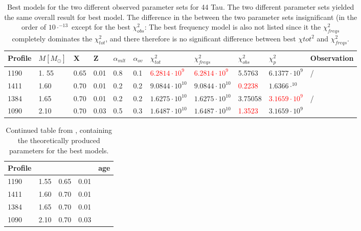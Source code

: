 \begin{table}
	\caption{Best models for the two different observed parameter sets for 44 Tau. The two different parameter sets yielded the same overall result for best model. The difference in the \chis between the two parameter sets insignificant (in the order of $10\cdot^{-13}$ except for the best $\chi_{obs}^2$: The best frequency model is also not listed since it the $\chi_{freqs}^2$ completely dominates the $\chi_{tot}^2$, and there therefore is no significant difference between best $\chi{tot}^2$ and $\chi_{freqs}^2$. }
	\label{bestmodels}
	
	\begin{tabular}{lllllllllll}
		\toprule
		Profile & $M[M_\odot]$  & X & Z & $\alpha_{mlt}$ & $\alpha_{ov}$ & $\chi_{tot}^2$ &$\chi_{freqs}^2$ & $\chi_{obs}^2$ & $\chi_{p}^2$ & Observation\\
		\midrule
		1190 &1. 55 & 0.65  & 0.01  & 0.8  & 0.1  & \textcolor{red}{$6.2814 \cdot 10^{9}$} &  \textcolor{red}{$6.2814 \cdot 10^{9}$} & 5.5763 & $6.1377 \cdot 10^{9}$ &  \citet{lenz2010delta}/\citet{brown2018gaia}\\
		1411 & 1.60 & 0.70  & 0.01  & 0.2  & 0.2 &  $9.0844\cdot 10^{10}$ & $9.0844\cdot 10^{10}$ & \textcolor{red}{0.2238} & $1.6366 \cdot^{10}$ &  \citet{lenz2010delta}  \\
		1384 & 1.65 & 0.70 & 0.01 & 0.2  & 0.2  & $1.6275\cdot10^{10}$    & $1.6275 \cdot 10^{10} $ & 3.75058  & \textcolor{red}{$3.1659 \cdot 10^{9} $} & \citet{lenz2010delta}/\citet{brown2018gaia}\\
		1090 & 2.10 & 0.70 & 0.03 & 0.5  & 0.3  &  $1.6487\cdot10^{10}$    & $1.6487 \cdot 10^{10} $ & \textcolor{red}{1.3523}  & $3.1659 \cdot 10^{9} $ & \citet{brown2018gaia}\\
	\bottomrule
	\end{tabular}
\end{table}

\begin{table}
	\centering
	\caption{Continued table from , containing the theoretically produced parameters for the best models. }
	\label{bestmodels_continued}
	
	\begin{tabular}{lllll}
		\toprule
		Profile &  \teff & \logg & \lum & age \\
		\midrule
		1190 &1.55 & 0.65  & 0.01  &\\
		1411 & 1.60 & 0.70  & 0.01  &\\
		1384 & 1.65 & 0.70 & 0.01 &\\
		1090 & 2.10 & 0.70 & 0.03 &\\
		\bottomrule
	\end{tabular}
\end{table}

